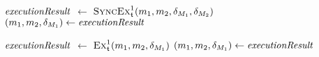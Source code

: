 \begin{algorithmic}[1]
        \algindentskip
            \State \Return{$\bot$}
        \EndIf
        \algblockskip

         \label{algo:synchronization:execute_synchronizing_bidirectional_transformation:line:synchronizationstart}
            \State $\mathit{executionResult}$ $\leftarrow$ $\function{SyncEx}_\transformation{t}^1(\model{m}{1}, \model{m}{2}, \change{\metamodel{M}{1}}, \change{\metamodel{M}{2}})$
                \State \Return{$\bot$} \label{algo:synchronization:execute_synchronizing_bidirectional_transformation:line:returnbot1}
            \Else
                \State $(\model{m}{1}, \model{m}{2}, \change{\metamodel{M}{1}}) \gets \mathvariable{executionResult}$
            \EndIf
        \EndIf \label{algo:synchronization:execute_synchronizing_bidirectional_transformation:line:synchronizationend}
        \algblockskip

            \State $\mathit{executionResult}$ $\leftarrow$ $\function{Ex}_\transformation{t}^1(\model{m}{1}, \model{m}{2}, \change{\metamodel{M}{1}})$
                \State \Return{$\bot$} \label{algo:execute_synchronizing_bidirectional_transformation:line:returnbot2}
            \Else
                \State $(\model{m}{1}, \model{m}{2}, \change{\metamodel{M}{1}}) \gets \mathvariable{executionResult}$
            \EndIf
        \EndWhile
        \algblockskip

        \State {} \label{algo:synchronization:execute_synchronizing_bidirectional_transformation:line:returnresult}
        \algindentskip
    \EndProcedure
\end{algorithmic}